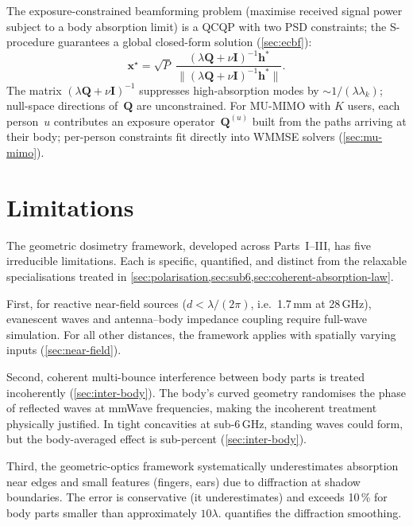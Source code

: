 \documentclass[11pt,a4paper]{article}
\theoremstyle{definition}      %
\begin{document}
The exposure-constrained beamforming problem (maximise received signal
power subject to a body absorption limit) is a QCQP with two PSD
constraints; the S-procedure guarantees a global closed-form solution
(\cref{sec:ecbf}):
\begin{equation}\label{sum:eq:optimal-x}
  \boxed{\mathbf{x}^\star = \sqrt{P}\;
    \frac{(\lambda\mathbf{Q}+\nu\mathbf{I})^{-1}\mathbf{h}^*}
         {\|(\lambda\mathbf{Q}+\nu\mathbf{I})^{-1}\mathbf{h}^*\|}.}
\end{equation}
The matrix $(\lambda\mathbf{Q}+\nu\mathbf{I})^{-1}$ suppresses
high-absorption modes by $\sim1/(\lambda\lambda_k)$; null-space
directions of~$\mathbf{Q}$ are unconstrained.
For MU-MIMO with $K$ users, each person~$u$ contributes an exposure
operator~$\mathbf{Q}^{(u)}$ built from the paths arriving at their
body; per-person constraints fit directly into WMMSE solvers
(\cref{sec:mu-mimo}).


\section{Limitations}\label{sec:limitations-v2}

The geometric dosimetry framework, developed across Parts~I--III,
has five irreducible limitations.  Each is specific, quantified, and
distinct from the relaxable specialisations treated in
\cref{sec:polarisation,sec:sub6,sec:coherent-absorption-law}.

First, for reactive near-field sources ($d < \lambda/(2\pi)$, i.e.\ 1.7\,mm at 28\,GHz),
evanescent waves and antenna--body impedance coupling require
full-wave simulation.  For all other distances, the framework
applies with spatially varying inputs (\cref{sec:near-field}).

Second, coherent multi-bounce interference between body parts is treated incoherently
(\cref{sec:inter-body}).  The body's curved geometry randomises the
phase of reflected waves at mmWave frequencies, making the
incoherent treatment physically justified.  In tight concavities
at sub-6\,GHz, standing waves could form, but the body-averaged
effect is sub-percent (\cref{sec:inter-body}).

Third, the geometric-optics framework systematically underestimates
absorption near edges and small features (fingers, ears) due to diffraction at shadow boundaries.  The
error is conservative (it underestimates) and exceeds 10\,\% for
body parts smaller than approximately $10\lambda$.
 quantifies the diffraction smoothing.
\end{document}
